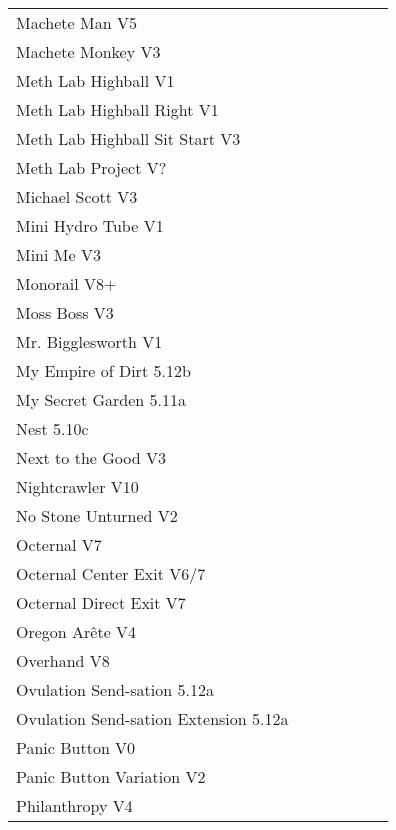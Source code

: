\begin{flushleft}
\begin{center}
\begin{supertabular}{p{0.76\linewidth}p{0.08\linewidth}}
Machete Man V5 & \pageref{vr:Machete Man} \\
Machete Monkey V3 & \pageref{rt:Machete Monkey} \\
Meth Lab Highball V1 & \pageref{rt:Meth Lab Highball} \\
Meth Lab Highball Right V1 & \pageref{rt:Meth Lab Highball Right} \\
Meth Lab Highball Sit Start V3 & \pageref{vr:Meth Lab Highball Sit Start} \\
Meth Lab Project V? & \pageref{rt:Meth Lab Project} \\
Michael Scott V3 & \pageref{rt:Michael Scott} \\
Mini Hydro Tube V1 & \pageref{rt:Mini Hydro Tube} \\
Mini Me V3 & \pageref{rt:Mini Me} \\
Monorail V8+ & \pageref{rt:Monorail} \\
Moss Boss V3 & \pageref{rt:Moss Boss} \\
Mr. Bigglesworth V1 & \pageref{vr:Mr. Bigglesworth} \\
My Empire of Dirt 5.12b & \pageref{rt:My Empire of Dirt} \\
My Secret Garden 5.11a & \pageref{rt:My Secret Garden} \\
Nest 5.10c & \pageref{rt:Nest} \\
Next to the Good V3 & \pageref{rt:Next to the Good} \\
Nightcrawler V10 & \pageref{rt:Nightcrawler} \\
No Stone Unturned V2 & \pageref{rt:No Stone Unturned} \\
Octernal V7 & \pageref{rt:Octernal} \\
Octernal Center Exit V6/7 & \pageref{vr:Octernal Center Exit} \\
Octernal Direct Exit V7 & \pageref{vr:Octernal Direct Exit} \\
Oregon Arête V4 & \pageref{rt:Oregon Arête} \\
Overhand V8 & \pageref{rt:Overhand} \\
Ovulation Send-sation 5.12a & \pageref{rt:Ovulation Send-sation} \\
Ovulation Send-sation Extension 5.12a & \pageref{vr:Ovulation Send-sation Extension} \\
Panic Button V0 & \pageref{rt:Panic Button} \\
Panic Button Variation V2 & \pageref{vr:Panic Button Variation} \\
Philanthropy V4 & \pageref{rt:Philanthropy} \\

\end{supertabular}
\end{center}
\end{flushleft}
